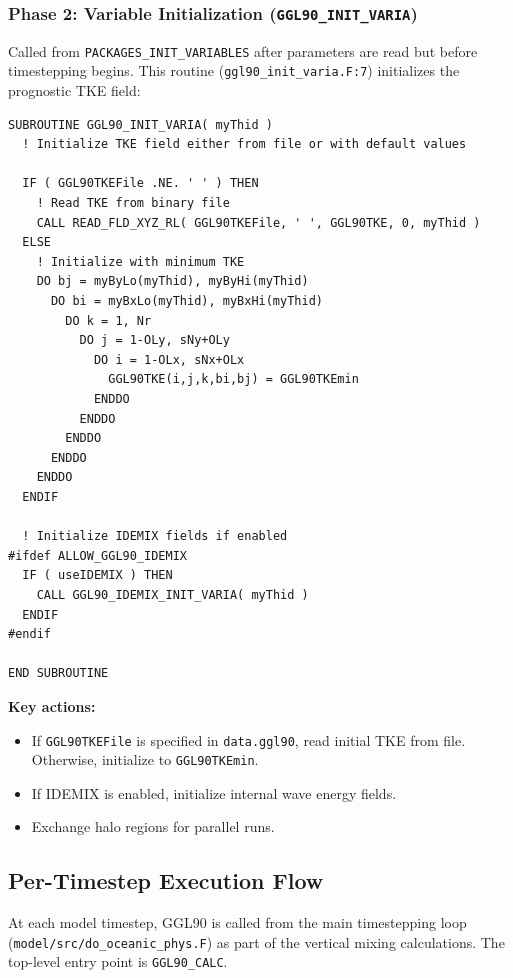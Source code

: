 \documentclass[12pt,letterpaper]{article}
\begin{document}
\subsubsection{Phase 2: Variable Initialization (\texttt{GGL90\_INIT\_VARIA})}

Called from \texttt{PACKAGES\_INIT\_VARIABLES} after parameters are read but
before timestepping begins. This routine (\texttt{ggl90\_init\_varia.F:7})
initializes the prognostic TKE field:

\begin{lstlisting}[caption={\texttt{ggl90\_init\_varia.F}, lines 42--80 (excerpts) -- TKE initialization.}]
SUBROUTINE GGL90_INIT_VARIA( myThid )
  ! Initialize TKE field either from file or with default values

  IF ( GGL90TKEFile .NE. ' ' ) THEN
    ! Read TKE from binary file
    CALL READ_FLD_XYZ_RL( GGL90TKEFile, ' ', GGL90TKE, 0, myThid )
  ELSE
    ! Initialize with minimum TKE
    DO bj = myByLo(myThid), myByHi(myThid)
      DO bi = myBxLo(myThid), myBxHi(myThid)
        DO k = 1, Nr
          DO j = 1-OLy, sNy+OLy
            DO i = 1-OLx, sNx+OLx
              GGL90TKE(i,j,k,bi,bj) = GGL90TKEmin
            ENDDO
          ENDDO
        ENDDO
      ENDDO
    ENDDO
  ENDIF

  ! Initialize IDEMIX fields if enabled
#ifdef ALLOW_GGL90_IDEMIX
  IF ( useIDEMIX ) THEN
    CALL GGL90_IDEMIX_INIT_VARIA( myThid )
  ENDIF
#endif

END SUBROUTINE
\end{lstlisting}

\textbf{Key actions:}
\begin{itemize}[leftmargin=*]
  \item If \texttt{GGL90TKEFile} is specified in \texttt{data.ggl90}, read
        initial TKE from file. Otherwise, initialize to \texttt{GGL90TKEmin}.
  \item If IDEMIX is enabled, initialize internal wave energy fields.
  \item Exchange halo regions for parallel runs.
\end{itemize}

\subsection{Per-Timestep Execution Flow}

At each model timestep, GGL90 is called from the main timestepping loop
(\texttt{model/src/do\_oceanic\_phys.F}) as part of the vertical mixing
calculations. The top-level entry point is \texttt{GGL90\_CALC}.
\end{document}
